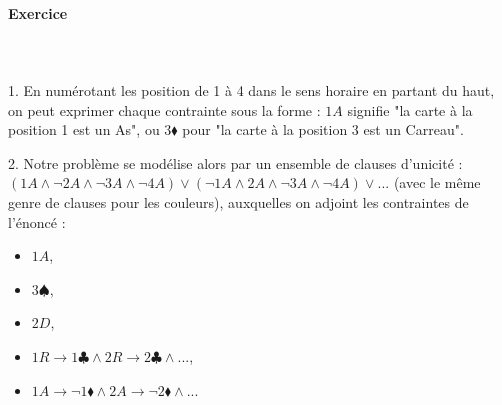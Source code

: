 \documentclass[a4paper]{article}
\newcounter{noexo}
\newcommand{\exo}{\stepcounter{noexo} \paragraph{Exercice \thenoexo} ~\\ ~\\}
\begin{document}
\exo
1. En numérotant les position de 1 à 4 dans le sens horaire en partant du haut, on peut exprimer chaque contrainte sous la forme : $1A$ signifie "la carte à la position 1 est un As", ou $3\blacklozenge$ pour "la carte à la position 3 est un Carreau".

2. Notre problème se modélise alors par un ensemble de clauses d'unicité : $(1A\wedge\neg 2A\wedge\neg 3A\wedge\neg 4A)\vee(\neg 1A\wedge 2A\wedge\neg 3A\wedge\neg 4A) \vee...$ (avec le même genre de clauses pour les couleurs), auxquelles on adjoint les contraintes de l'énoncé :\begin{itemize}
\item $1A$,
\item $3\spadesuit$,
\item $2D$,
\item $1R\rightarrow 1\clubsuit \wedge 2R\rightarrow 2\clubsuit \wedge ...$, 
\item $1A\rightarrow \neg 1\blacklozenge \wedge 2A\rightarrow \neg 2\blacklozenge \wedge...$
\end{itemize}
\end{document}
